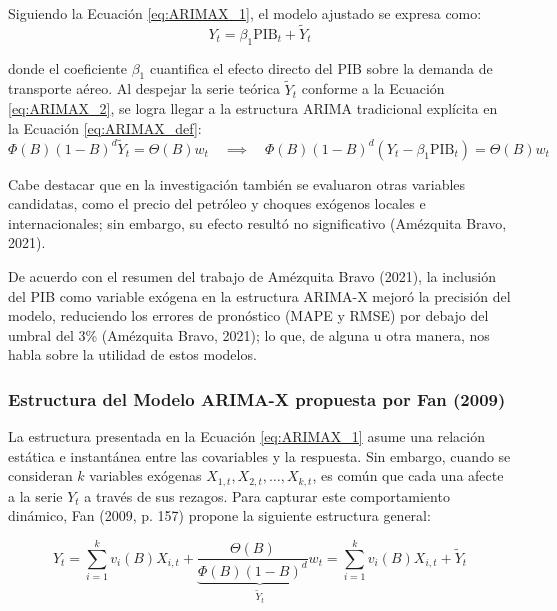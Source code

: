 \documentclass[11pt,letterpaper]{article}
\begin{document}
Siguiendo la Ecuación \ref{eq:ARIMAX_1}, el modelo ajustado se expresa como:
\begin{equation*}
Y_t = \beta_1 \text{PIB}_t + \tilde{Y}_t
\end{equation*}

donde el coeficiente $\beta_1$ cuantifica el efecto directo del PIB sobre la demanda de transporte aéreo. Al despejar la serie teórica $\tilde{Y}_t$ conforme a la Ecuación \ref{eq:ARIMAX_2}, se logra llegar a la estructura ARIMA tradicional explícita en la Ecuación \ref{eq:ARIMAX_def}:
\begin{equation*}
\Phi(B) (1-B)^d \tilde{Y}_t = \Theta(B) w_t \quad \implies \quad \Phi(B) (1-B)^d \left( Y_t - \beta_1 \text{PIB}_t \right) = \Theta(B) w_t
\end{equation*}

Cabe destacar que en la investigación también se evaluaron otras variables candidatas, como el precio del petróleo y choques exógenos locales e internacionales; sin embargo, su efecto resultó no significativo (Amézquita Bravo, 2021). 

De acuerdo con el resumen del trabajo de Amézquita Bravo (2021), la inclusión del PIB como variable exógena en la estructura ARIMA-X mejoró la precisión del modelo, reduciendo los errores de pronóstico (MAPE y RMSE) por debajo del umbral del 3\% (Amézquita Bravo, 2021); lo que, de alguna u otra manera, nos habla sobre la utilidad de estos modelos.

\subsubsection{Estructura del Modelo ARIMA-X propuesta por Fan (2009)}
\label{sec:gen_ARIMAX}

La estructura presentada en la Ecuación \ref{eq:ARIMAX_1} asume una relación estática e instantánea entre las covariables y la respuesta. Sin embargo, cuando se consideran $k$ variables exógenas $X_{1,t}, X_{2,t}, \dots, X_{k,t}$, es común que cada una afecte a la serie $Y_t$ a través de sus rezagos. Para capturar este comportamiento dinámico, Fan (2009, p. 157) propone la siguiente estructura general:

\begin{equation}
Y_t = \sum_{i=1}^k v_i(B) X_{i,t} + \underbrace{\frac{\Theta(B)}{\Phi(B)(1-B)^d} w_t}_{\tilde{Y}_t} = \sum_{i=1}^k v_i(B) X_{i,t} + \tilde{Y}_t
\label{eq:ARIMAX_general}
\end{equation}
\end{document}

